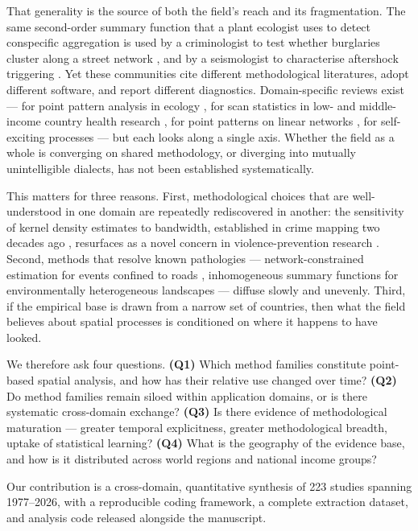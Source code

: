 \documentclass[11pt,a4paper]{article}
\begin{document}
That generality is the source of both the field's reach and its fragmentation.
The same second-order summary function that a plant ecologist uses to detect
conspecific aggregation \citep{haase1995,perry2006,law2009} is used by a
criminologist to test whether burglaries cluster along a street network
\citep{khalid2017}, and by a seismologist to characterise aftershock
triggering \citep{ogata2006}. Yet these communities cite different
methodological literatures, adopt different software, and report different
diagnostics. Domain-specific reviews exist --- for point pattern analysis in
ecology \citep{velazquez2016,bensaid2021}, for scan statistics in
low- and middle-income country health research \citep{aboushady2025}, for
point patterns on linear networks \citep{baddeley2020}, for self-exciting
processes \citep{reinhart2017,bernabeu2024} --- but each looks along a single
axis. Whether the field as a whole is converging on shared methodology, or
diverging into mutually unintelligible dialects, has not been established
systematically.

This matters for three reasons. First, methodological choices that are
well-understood in one domain are repeatedly rediscovered in another: the
sensitivity of kernel density estimates to bandwidth, established in crime
mapping two decades ago \citep{chainey2008,chainey2014,hart2014}, resurfaces as
a novel concern in violence-prevention research \citep{zewdie2025}. Second,
methods that resolve known pathologies --- network-constrained estimation for
events confined to roads \citep{okabe2009,baddeley2020}, inhomogeneous
summary functions for environmentally heterogeneous landscapes
\citep{law2009,wiegand2007} --- diffuse slowly and unevenly. Third, if the
empirical base is drawn from a narrow set of countries, then what the field
believes about spatial processes is conditioned on where it happens to have
looked.

We therefore ask four questions. \textbf{(Q1)} Which method families
constitute point-based spatial analysis, and how has their relative use
changed over time? \textbf{(Q2)} Do method families remain siloed within
application domains, or is there systematic cross-domain exchange?
\textbf{(Q3)} Is there evidence of methodological maturation --- greater
temporal explicitness, greater methodological breadth, uptake of statistical
learning? \textbf{(Q4)} What is the geography of the evidence base, and how is
it distributed across world regions and national income groups?

Our contribution is a cross-domain, quantitative synthesis of 223 studies
spanning 1977--2026, with a reproducible coding framework, a complete
extraction dataset, and analysis code released alongside the manuscript.
\end{document}
